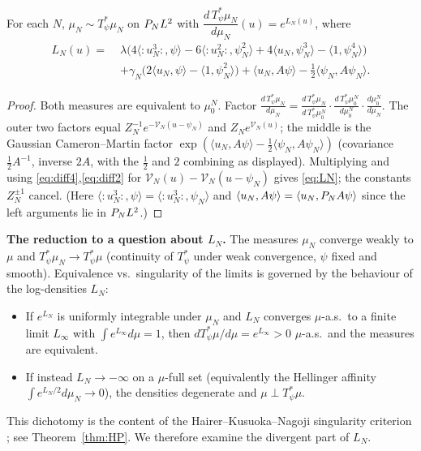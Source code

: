 \begin{qonelemma}\label{lem:density}
For each $N$, $\mu_N\sim T_\psi^*\mu_N$ on $P_N L^2$ with
$\dfrac{d\,T_\psi^*\mu_N}{d\mu_N}(u)=e^{L_N(u)}$, where
\begin{equation}\label{eq:LN}
\begin{aligned}
L_N(u)=\;&\lambda\bigl(4\langle{:}u_N^3{:},\psi\rangle-6\langle{:}u_N^2{:},\psi_N^2\rangle+4\langle u_N,\psi_N^3\rangle-\langle1,\psi_N^4\rangle\bigr)\\
&+\gamma_N\bigl(2\langle u_N,\psi\rangle-\langle1,\psi_N^2\rangle\bigr)+\langle u_N,A\psi\rangle-\tfrac12\langle\psi_N,A\psi_N\rangle .
\end{aligned}
\end{equation}
\end{qonelemma}
\begin{proof}
Both measures are equivalent to $\mu_0^N$. Factor
$\frac{d\,T_\psi^*\mu_N}{d\mu_N}=\frac{d\,T_\psi^*\mu_N}{d\,T_\psi^*\mu_0^N}\cdot\frac{d\,T_\psi^*\mu_0^N}{d\mu_0^N}\cdot\frac{d\mu_0^N}{d\mu_N}$.
The outer two factors equal $Z_N^{-1}e^{-\mathcal V_N(u-\psi_N)}$ and
$Z_Ne^{\mathcal V_N(u)}$; the middle is the Gaussian Cameron--Martin factor
$\exp(\langle u_N,A\psi\rangle-\tfrac12\langle\psi_N,A\psi_N\rangle)$ (covariance
$\tfrac12A^{-1}$, inverse $2A$, with the $\tfrac12$ and $2$ combining as displayed).
Multiplying and using \eqref{eq:diff4},\eqref{eq:diff2} for
$\mathcal V_N(u)-\mathcal V_N(u-\psi_N)$ gives \eqref{eq:LN}; the constants $Z_N^{\pm1}$
cancel. (Here $\langle{:}u_N^3{:},\psi\rangle=\langle{:}u_N^3{:},\psi_N\rangle$ and
$\langle u_N,A\psi\rangle=\langle u_N,P_N A\psi\rangle$ since the left arguments lie
in $P_N L^2$.)
\end{proof}

\noindent\textbf{The reduction to a question about $L_N$.} The measures $\mu_N$
converge weakly to $\mu$ and $T_\psi^*\mu_N\to T_\psi^*\mu$ (continuity of $T_\psi^*$
under weak convergence, $\psi$ fixed and smooth). Equivalence vs.\ singularity of the
limits is governed by the behaviour of the log-densities $L_N$:
\begin{itemize}
\item If $e^{L_N}$ is uniformly integrable under $\mu_N$ and $L_N$ converges
$\mu$-a.s.\ to a finite limit $L_\infty$ with $\int e^{L_\infty}d\mu=1$, then
$dT_\psi^*\mu/d\mu=e^{L_\infty}>0$ $\mu$-a.s.\ and the measures are equivalent.
\item If instead $L_N\to-\infty$ on a $\mu$-full set (equivalently the Hellinger affinity
$\int e^{L_N/2}d\mu_N\to0$), the densities degenerate and $\mu\perp T_\psi^*\mu$.
\end{itemize}
This dichotomy is the content of the Hairer--Kusuoka--Nagoji singularity criterion
\cite{HKN24}; see Theorem~\ref{thm:HP}. We therefore examine the divergent part of
$L_N$.

